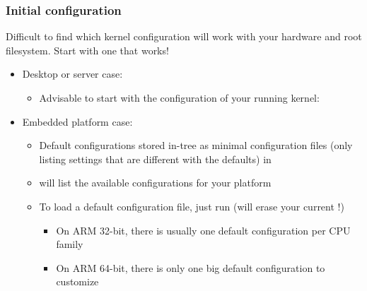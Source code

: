 \begin{frame}
  \frametitle{Initial configuration}
  Difficult to find which kernel configuration will work
  with your hardware and root filesystem. Start with one
  that works!
  \begin{itemize}
  \item Desktop or server case:
     \begin{itemize}
       \item Advisable to start with the configuration of your running
	  kernel:\\
     \end{itemize}
   \item Embedded platform case:
     \begin{itemize}
       \item Default configurations stored in-tree as minimal
         configuration files (only listing settings that are different
         with the defaults) in 
       \item {} will list the available configurations for
         your platform
       \item To load a default configuration file, just run
          (will erase your current
         !)
         \begin{itemize}
           \item On ARM 32-bit, there is usually one default
             configuration per CPU family
           \item On ARM 64-bit, there is only one big default
             configuration to customize
         \end{itemize}
     \end{itemize}
  \end{itemize}
\end{frame}

